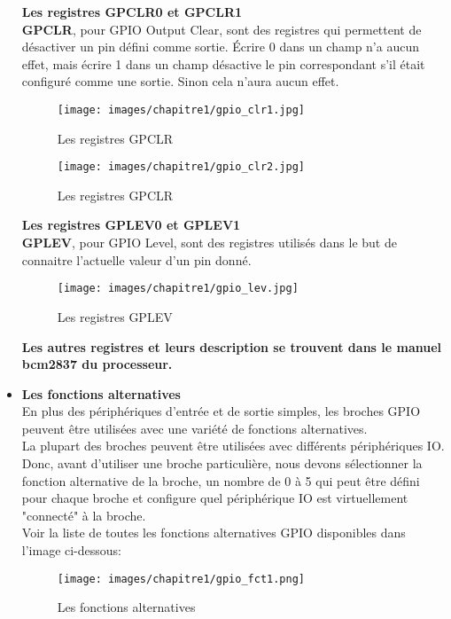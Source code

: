 \documentclass[12pt,a4paper,oneside]{book}
\begin{document}
\begin{itemize}
		\textbf{Les registres GPCLR0 et GPCLR1}\\
			\textbf{GPCLR}, pour GPIO Output Clear, sont des registres qui permettent de désactiver un pin défini comme sortie. Écrire 0 dans un champ n'a aucun effet, mais écrire 1 dans un champ désactive le pin correspondant s'il était configuré comme une sortie. Sinon cela n'aura aucun effet.\\
			\begin{figure}[H]
				\centering
				\texttt{[image: images/chapitre1/gpio\_clr1.jpg]}
				\caption{Les registres GPCLR}
				\label{Types}
			\end{figure}
			\begin{figure}[H]
				\centering
				\texttt{[image: images/chapitre1/gpio\_clr2.jpg]}
				\caption{Les registres GPCLR}
				\label{Types}
			\end{figure}
			
			
		\textbf{Les registres GPLEV0 et GPLEV1}\\
			\textbf{GPLEV}, pour GPIO Level, sont des registres utilisés dans le but de connaitre l'actuelle valeur d'un pin donné.	\\
			\begin{figure}[H]
					\centering
					\texttt{[image: images/chapitre1/gpio\_lev.jpg]}
					\caption{Les registres GPLEV}
					\label{Types}
			\end{figure}
			
		\textbf{Les autres registres et leurs description se trouvent dans le manuel bcm2837 du processeur.}\\
	\item \textbf{Les fonctions alternatives}\\
	En plus des périphériques d’entrée et de sortie simples, les broches GPIO peuvent être utilisées avec une variété de fonctions alternatives.\\
	La plupart des broches peuvent être utilisées avec différents périphériques IO. Donc, avant d'utiliser une broche particulière, nous devons sélectionner la fonction alternative de la broche, un nombre de 0 à 5 qui peut être défini pour chaque broche et configure quel périphérique IO est virtuellement "connecté" à la broche.\\

	Voir la liste de toutes les fonctions alternatives GPIO disponibles dans l'image ci-dessous:\\
	\begin{figure}[H]
			\centering
			\texttt{[image: images/chapitre1/gpio\_fct1.png]}
			\caption{Les fonctions alternatives}
			\label{Types}
	\end{figure}
	\end{itemize}
\end{document}
